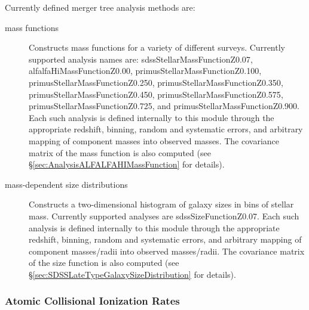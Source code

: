 Currently defined merger tree analysis methods are:
\begin{description}
 \item [mass functions] Constructs mass functions for a variety of different surveys. Currently supported analysis names are: {\normalfont \ttfamily sdssStellarMassFunctionZ0.07}, {\normalfont \ttfamily alfalfaHiMassFunctionZ0.00}, {\normalfont \ttfamily primusStellarMassFunctionZ0.100}, {\normalfont \ttfamily primusStellarMassFunctionZ0.250}, {\normalfont \ttfamily primusStellarMassFunctionZ0.350}, {\normalfont \ttfamily primusStellarMassFunctionZ0.450}, {\normalfont \ttfamily primusStellarMassFunctionZ0.575}, {\normalfont \ttfamily primusStellarMassFunctionZ0.725}, and {\normalfont \ttfamily primusStellarMassFunctionZ0.900}. Each such analysis is defined internally to this module through the appropriate redshift, binning, random and systematic errors, and arbitrary mapping of component masses into observed masses. The covariance matrix of the mass function is also computed (see \S\ref{sec:AnalysisALFALFAHIMassFunction} for details).
 \item [mass-dependent size distributions] Constructs a two-dimensional histogram of galaxy sizes in bins of stellar mass. Currently supported analyses are {\normalfont \ttfamily sdssSizeFunctionZ0.07}. Each such analysis is defined internally to this module through the appropriate redshift, binning, random and systematic errors, and arbitrary mapping of component masses/radii into observed masses/radii. The covariance matrix of the size function is also computed (see \S\ref{sec:SDSSLateTypeGalaxySizeDistribution} for details).
\end{description}

\subsubsection{Atomic Collisional Ionization Rates}

